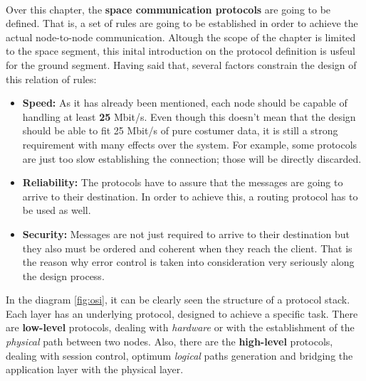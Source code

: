 \paragraph{}
Over this chapter, the \textbf{space communication protocols} are going to be defined. That is, a set of rules are going to be established in order to achieve the actual node-to-node communication. Altough the scope of the chapter is limited to the space segment, this inital introduction on the protocol definition is usfeul for the ground segment.
Having said that, several factors constrain the design of this relation of rules:

\begin{itemize}
\renewcommand{\labelitemi}{\scriptsize$\blacksquare$} 
\item \textbf{Speed:} As it has already been mentioned, each node should be capable of handling at least \textbf{25} Mbit/s. Even though this doesn't mean that the design should be able to fit 25 Mbit/s of pure costumer data, it is still a strong requirement with many effects over the system. For example, some protocols are just too slow establishing the connection; those will be directly discarded.

\item \textbf{Reliability:} The protocols have to assure that the messages are going to arrive to their destination. In order to achieve this, a routing protocol has to be used as well.


\item \textbf{Security:} Messages are not just required to arrive to their destination but they also must be ordered and coherent when they reach the client. That is the reason why error control is taken into consideration very seriously along the design process.
\end{itemize}
In the diagram \ref{fig:osi}, it can be clearly seen the structure of a protocol stack. Each layer has an underlying protocol, designed to achieve a specific task. There are \textbf{low-level} protocols, dealing with \textit{hardware} or with the establishment of the \textit{physical} path between two nodes. Also, there are the \textbf{high-level} protocols, dealing with session control, optimum \textit{logical} paths generation and bridging the application layer with the physical layer.
